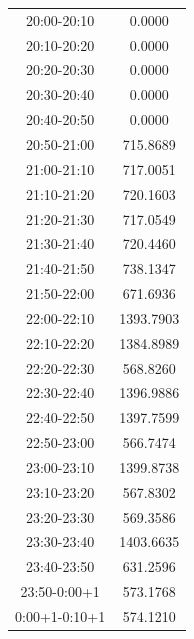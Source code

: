 \begin{longtable}{@{}cc@{}}
20:00-20:10 & 0.0000 \\
20:10-20:20 & 0.0000 \\
20:20-20:30 & 0.0000 \\
20:30-20:40 & 0.0000 \\
20:40-20:50 & 0.0000 \\
20:50-21:00 & 715.8689 \\
21:00-21:10 & 717.0051 \\
21:10-21:20 & 720.1603 \\
21:20-21:30 & 717.0549 \\
21:30-21:40 & 720.4460 \\
21:40-21:50 & 738.1347 \\
21:50-22:00 & 671.6936 \\
22:00-22:10 & 1393.7903 \\
22:10-22:20 & 1384.8989 \\
22:20-22:30 & 568.8260 \\
22:30-22:40 & 1396.9886 \\
22:40-22:50 & 1397.7599 \\
22:50-23:00 & 566.7474 \\
23:00-23:10 & 1399.8738 \\
23:10-23:20 & 567.8302 \\
23:20-23:30 & 569.3586 \\
23:30-23:40 & 1403.6635 \\
23:40-23:50 & 631.2596 \\
23:50-0:00+1 & 573.1768 \\
0:00+1-0:10+1 & 574.1210 \\
\end{longtable}
\endgroup
